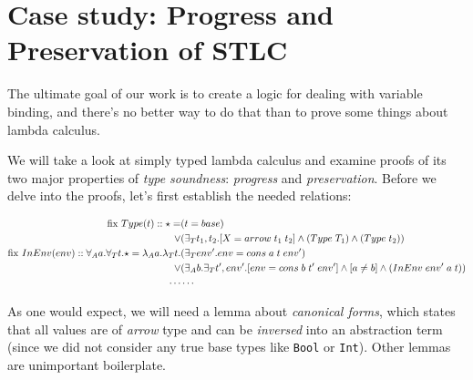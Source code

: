 \documentclass[english, mgr]{iithesis}
\begin{document}
\chapter{Case study: Progress and Preservation of STLC}

The ultimate goal of our work is to create a logic for dealing with variable binding,
and there's no better way to do that than to prove some things about lambda calculus.

We will take a look at simply typed lambda calculus and examine proofs of
its two major properties of \textit{type soundness}: \textit{progress} and \textit{preservation}.
Before we delve into the proofs, let's first establish the needed relations:

\begin{eqnarray*}
\text{fix }Type(t)::\star= &
  (t = {base}) \\
   \vee & (\exists_T t_1, t_2 .{[X = {arrow}\;t_1\;t_2]\wedge{({Type}\;T_1) \wedge ({Type}\;t_2) }}) \\
\text{fix }InEnv(env)::\forall_A a .\forall_T t .\star=  \lambda_A a . \lambda_T t . &
  (\exists_T env' . {env = {cons}\;a\;t\;env'})  \\
  \vee &
  (\exists_A b .\exists_T t', env' .[env = {cons}\;b\;t'\;env']\wedge[a \neq b]\wedge({InEnv}\;env'\;a\;t) ) \\
  \cdots & \cdots
\end{eqnarray*}

As one would expect, we will need a lemma about \textit{canonical forms},
which states that all values are of \textit{arrow} type and can be \textit{inversed} into an abstraction term
(since we did not consider any true base types like \texttt{Bool} or \texttt{Int}).
Other lemmas are unimportant boilerplate.
\end{document}
